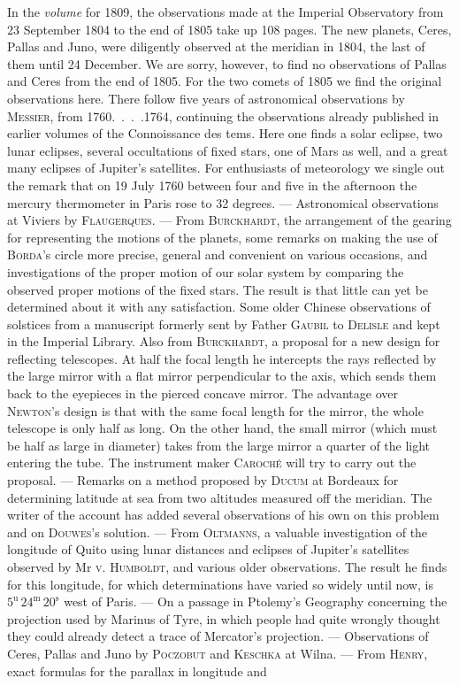 In the \emph{volume} for 1809, the observations made at the Imperial Observatory from 23 September 1804 to the end of 1805 take up 108 pages. The new planets, Ceres, Pallas and Juno, were diligently observed at the meridian in 1804, the last of them until 24 December. We are sorry, however, to find no observations of Pallas and Ceres from the end of 1805. For the two comets of 1805 we find the original observations here. There follow five years of astronomical observations by \textsc{Messier}, from 1760\mbox{. . . .}1764, continuing the observations already published in earlier volumes of the Connoissance des tems. Here one finds a solar eclipse, two lunar eclipses, several occultations of fixed stars, one of Mars as well, and a great many eclipses of Jupiter’s satellites. For enthusiasts of meteorology we single out the remark that on 19 July 1760 between four and five in the afternoon the mercury thermometer in Paris rose to 32 degrees. --- Astronomical observations at Viviers by \textsc{Flaugerques}. --- From \textsc{Burckhardt}, the arrangement of the gearing for representing the motions of the planets, some remarks on making the use of \textsc{Borda}’s circle more precise, general and convenient on various occasions, and investigations of the proper motion of our solar system by comparing the observed proper motions of the fixed stars. The result is that little can yet be determined about it with any satisfaction. Some older Chinese observations of solstices from a manuscript formerly sent by Father \textsc{Gaubil} to \textsc{Delisle} and kept in the Imperial Library. Also from \textsc{Burckhardt}, a proposal for a new design for reflecting telescopes. At half the focal length he intercepts the rays reflected by the large mirror with a flat mirror perpendicular to the axis, which sends them back to the eyepieces in the pierced concave mirror. The advantage over \textsc{Newton}’s design is that with the same focal length for the mirror, the whole telescope is only half as long. On the other hand, the small mirror (which must be half as large in diameter) takes from the large mirror a quarter of the light entering the tube. The instrument maker \textsc{Caroché} will try to carry out the proposal. --- Remarks on a method proposed by \textsc{Ducum} at Bordeaux for determining latitude at sea from two altitudes measured off the meridian. The writer of the account has added several observations of his own on this problem and on \textsc{Douwes}’s solution. --- From \textsc{Oltmanns}, a valuable investigation of the longitude of Quito using lunar distances and eclipses of Jupiter’s satellites observed by Mr \textsc{v. Humboldt}, and various older observations. The result he finds for this longitude, for which determinations have varied so widely until now, is $5^{\mathrm u}\,24^{\mathrm m}\,20^{\mathrm s}$ west of Paris. --- On a passage in Ptolemy’s Geography concerning the projection used by Marinus of Tyre, in which people had quite wrongly thought they could already detect a trace of Mercator’s projection. --- Observations of Ceres, Pallas and Juno by \textsc{Poczobut} and \textsc{Keschka} at Wilna. --- From \textsc{Henry}, exact formulas for the parallax in longitude and
